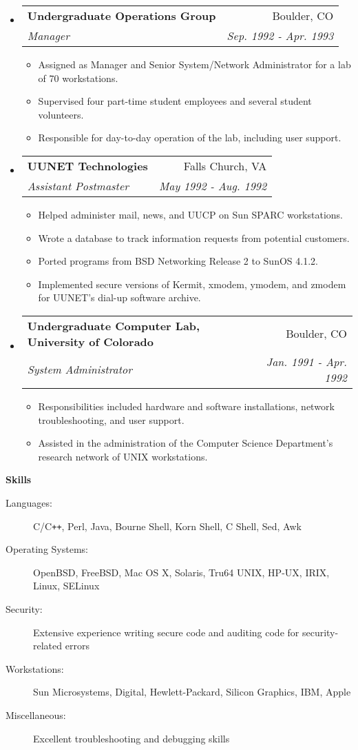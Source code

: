 \documentclass[letterpaper,11pt]{article}
\makeatletter
\newcommand{\resitem}[1]{\item #1 \vspace{-2pt}}
\newcommand{\resheading}[1]{{\large \colorbox{mygrey}{\begin{minipage}{\textwidth}{\textbf{#1 \vphantom{p\^{E}}}}\end{minipage}}}}
\newcommand{\ressubheading}[4]{
\begin{tabular*}{7.0in}{l@{\extracolsep{\fill}}r}
      \textbf{#1} & #2 \\
      \textit{#3} & \textit{#4} \\
\end{tabular*}\vspace{-6pt}}
\makeatother
\begin{document}
\begin{itemize}
\item
   \ressubheading{Undergraduate Operations Group}{Boulder, CO}{Manager}{Sep. 1992 - Apr. 1993}
   \begin{itemize}
      \resitem{Assigned as Manager and Senior System/Network Administrator for a lab of 70 workstations.}
      \resitem{Supervised four part-time student employees and several student volunteers.}
      \resitem{Responsible for day-to-day operation of the lab, including user support.}
   \end{itemize}

\item
   \ressubheading{{\sc \bf UUNET} Technologies}{Falls Church, VA}{Assistant Postmaster}{May 1992 - Aug. 1992}
   \begin{itemize}
      \resitem{Helped administer mail, news, and {\sc UUCP} on Sun SPARC workstations.}
      \resitem{Wrote a database to track information requests from potential customers.}
      \resitem{Ported programs from BSD Networking Release 2 to SunOS 4.1.2.}
      \resitem{Implemented secure versions of Kermit, xmodem, ymodem, and zmodem for {\sc UUNET}'s dial-up software archive.}
   \end{itemize}

\item
   \ressubheading{Undergraduate Computer Lab, University of Colorado}{Boulder, CO}{System Administrator}{Jan. 1991 - Apr. 1992}
   \begin{itemize}
      \resitem{Responsibilities included hardware and software installations, network troubleshooting, and user support.}
      \resitem{Assisted in the administration of the Computer Science Department's research network of {\sc UNIX} workstations.}
   \end{itemize}

\end{itemize}

\pagebreak

\resheading{Skills}

\begin{description}
\item[Languages:]
C/C{}\verb!++!, Perl, Java, Bourne Shell, Korn Shell, C Shell, Sed, Awk
\item[Operating Systems:]
OpenBSD, FreeBSD, Mac OS X, Solaris, Tru64 {\sc UNIX}, {\sc HP-UX}, {\sc IRIX}, Linux, SELinux
\item[Security:]
Extensive experience writing secure code and auditing code for security-related errors
\item[Workstations:]
Sun Microsystems, Digital, Hewlett-Packard, Silicon Graphics, {\sc IBM}, Apple
\item[Miscellaneous:]
Excellent troubleshooting and debugging skills
\end{description}
\end{document}
